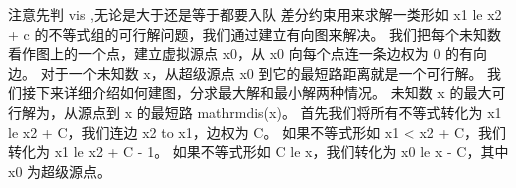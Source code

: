{}注意先判\markdownRendererDollarSign{} vis \markdownRendererDollarSign{},无论是大于还是等于都要入队\markdownRendererInterblockSeparator
{}
\markdownRendererSectionEnd \markdownRendererSectionBegin
{}\markdownRendererInterblockSeparator
{}差分约束用来求解一类形如 \markdownRendererDollarSign{}x\markdownRendererUnderscore{}1 \markdownRendererBackslash{}le x\markdownRendererUnderscore{}2 + c\markdownRendererDollarSign{} 的不等式组的可行解问题，我们通过建立有向图来解决。\markdownRendererParagraphSeparator
{}我们把每个未知数看作图上的一个点，建立虚拟源点 \markdownRendererDollarSign{}x\markdownRendererUnderscore{}0\markdownRendererDollarSign{}，从 \markdownRendererDollarSign{}x\markdownRendererUnderscore{}0\markdownRendererDollarSign{} 向每个点连一条边权为 \markdownRendererDollarSign{}0\markdownRendererDollarSign{} 的有向边。\markdownRendererHardLineBreak
{}对于一个未知数 \markdownRendererDollarSign{}x\markdownRendererDollarSign{}，从超级源点 \markdownRendererDollarSign{}x\markdownRendererUnderscore{}0\markdownRendererDollarSign{} 到它的最短路距离就是一个可行解。\markdownRendererParagraphSeparator
{}我们接下来详细介绍如何建图，分求最大解和最小解两种情况。\markdownRendererParagraphSeparator
{}\markdownRendererHardLineBreak
{}未知数 \markdownRendererDollarSign{}x\markdownRendererDollarSign{} 的最大可行解为，从源点到 \markdownRendererDollarSign{}x\markdownRendererDollarSign{} 的最短路 \markdownRendererDollarSign{}\markdownRendererBackslash{}mathrm\markdownRendererLeftBrace{}dis\markdownRendererRightBrace{}(x)\markdownRendererDollarSign{}。\markdownRendererHardLineBreak
{}首先我们将所有不等式转化为 \markdownRendererDollarSign{}x\markdownRendererUnderscore{}1 \markdownRendererBackslash{}le x\markdownRendererUnderscore{}2 + C\markdownRendererDollarSign{}，我们连边 \markdownRendererDollarSign{}x\markdownRendererUnderscore{}2 \markdownRendererBackslash{}to x\markdownRendererUnderscore{}1\markdownRendererDollarSign{}，边权为 \markdownRendererDollarSign{}C\markdownRendererDollarSign{}。\markdownRendererHardLineBreak
{}如果不等式形如 \markdownRendererDollarSign{}x\markdownRendererUnderscore{}1 < x\markdownRendererUnderscore{}2 + C\markdownRendererDollarSign{}，我们转化为 \markdownRendererDollarSign{}x\markdownRendererUnderscore{}1 \markdownRendererBackslash{}le x\markdownRendererUnderscore{}2 + C - 1\markdownRendererDollarSign{}。\markdownRendererHardLineBreak
{}如果不等式形如 \markdownRendererDollarSign{}C \markdownRendererBackslash{}le x\markdownRendererDollarSign{}，我们转化为 \markdownRendererDollarSign{}x\markdownRendererUnderscore{}0 \markdownRendererBackslash{}le x - C\markdownRendererDollarSign{}，其中 \markdownRendererDollarSign{}x\markdownRendererUnderscore{}0\markdownRendererDollarSign{} 为超级源点。\markdownRendererParagraphSeparator

